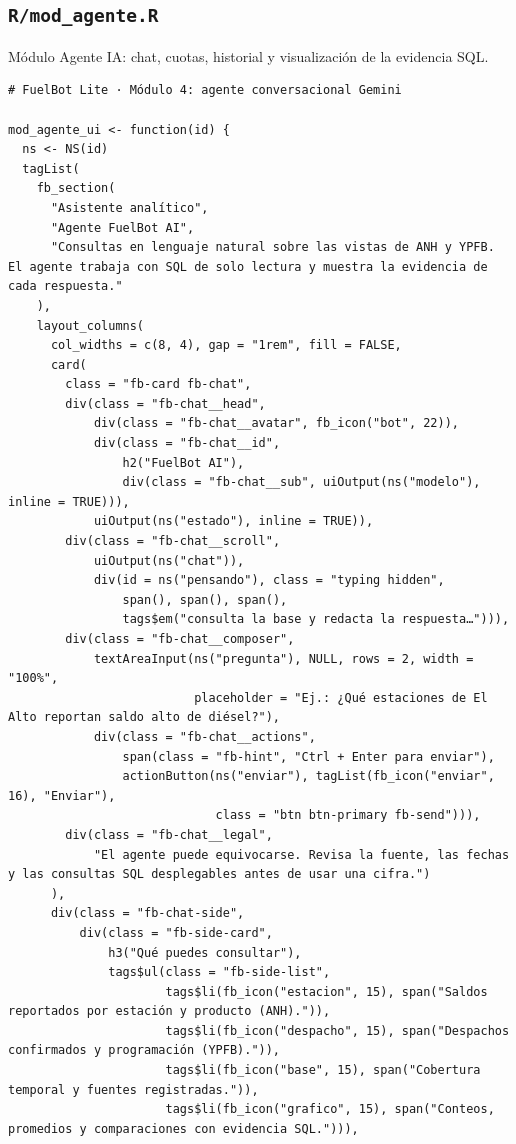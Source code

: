 \subsection{\texttt{R/mod\_agente.R}}
Módulo Agente IA: chat, cuotas, historial y visualización de la evidencia SQL.
\begin{lstlisting}[style=anexoR]
# FuelBot Lite · Módulo 4: agente conversacional Gemini

mod_agente_ui <- function(id) {
  ns <- NS(id)
  tagList(
    fb_section(
      "Asistente analítico",
      "Agente FuelBot AI",
      "Consultas en lenguaje natural sobre las vistas de ANH y YPFB. El agente trabaja con SQL de solo lectura y muestra la evidencia de cada respuesta."
    ),
    layout_columns(
      col_widths = c(8, 4), gap = "1rem", fill = FALSE,
      card(
        class = "fb-card fb-chat",
        div(class = "fb-chat__head",
            div(class = "fb-chat__avatar", fb_icon("bot", 22)),
            div(class = "fb-chat__id",
                h2("FuelBot AI"),
                div(class = "fb-chat__sub", uiOutput(ns("modelo"), inline = TRUE))),
            uiOutput(ns("estado"), inline = TRUE)),
        div(class = "fb-chat__scroll",
            uiOutput(ns("chat")),
            div(id = ns("pensando"), class = "typing hidden",
                span(), span(), span(),
                tags$em("consulta la base y redacta la respuesta…"))),
        div(class = "fb-chat__composer",
            textAreaInput(ns("pregunta"), NULL, rows = 2, width = "100%",
                          placeholder = "Ej.: ¿Qué estaciones de El Alto reportan saldo alto de diésel?"),
            div(class = "fb-chat__actions",
                span(class = "fb-hint", "Ctrl + Enter para enviar"),
                actionButton(ns("enviar"), tagList(fb_icon("enviar", 16), "Enviar"),
                             class = "btn btn-primary fb-send"))),
        div(class = "fb-chat__legal",
            "El agente puede equivocarse. Revisa la fuente, las fechas y las consultas SQL desplegables antes de usar una cifra.")
      ),
      div(class = "fb-chat-side",
          div(class = "fb-side-card",
              h3("Qué puedes consultar"),
              tags$ul(class = "fb-side-list",
                      tags$li(fb_icon("estacion", 15), span("Saldos reportados por estación y producto (ANH).")),
                      tags$li(fb_icon("despacho", 15), span("Despachos confirmados y programación (YPFB).")),
                      tags$li(fb_icon("base", 15), span("Cobertura temporal y fuentes registradas.")),
                      tags$li(fb_icon("grafico", 15), span("Conteos, promedios y comparaciones con evidencia SQL."))),

\end{lstlisting}
